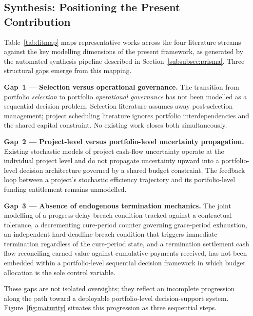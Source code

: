 \subsection{Synthesis: Positioning the Present Contribution}
\label{subsec:lr_synthesis}

Table~\ref{tab:litmap} maps representative works across the four
literature streams against the key modelling dimensions of the present
framework, as generated by the automated synthesis pipeline described
in Section~\ref{subsubsec:prisma}. Three structural gaps emerge from
this mapping.

\textbf{Gap~1 --- Selection versus operational governance.}\;
The transition from portfolio \emph{selection} to portfolio
\emph{operational governance} has not been modelled as a sequential
decision problem. Selection literature assumes away post-selection
management; project scheduling literature ignores portfolio
interdependencies and the shared capital constraint. No existing work
closes both simultaneously.

\textbf{Gap~2 --- Project-level versus portfolio-level uncertainty
propagation.}\;
Existing stochastic models of project cash-flow uncertainty operate
at the individual project level and do not propagate uncertainty
upward into a portfolio-level decision architecture governed by a
shared budget constraint. The feedback loop between a project's
stochastic efficiency trajectory and its portfolio-level funding
entitlement remains unmodelled.

\textbf{Gap~3 --- Absence of endogenous termination mechanics.}\;
The joint modelling of a progress-delay breach condition tracked
against a contractual tolerance, a decrementing cure-period counter
governing grace-period exhaustion, an independent hard-deadline
breach condition that triggers immediate termination regardless of
the cure-period state, and a termination settlement cash flow
reconciling earned value against cumulative payments received, has
not been embedded within a portfolio-level sequential decision
framework in which budget allocation is the sole control variable.

\medskip
These gaps are not isolated oversights; they reflect an incomplete
progression along the path toward a deployable portfolio-level
decision-support system. Figure~\ref{fig:maturity} situates this
progression as three sequential steps.

